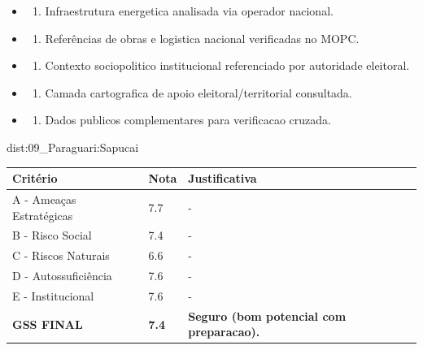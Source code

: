 {\begin{itemize}
\item
  \begin{enumerate}
  \def\labelenumi{\arabic{enumi})}
  \setcounter{enumi}{7}
  \tightlist
  \item
    Infraestrutura energetica analisada via operador nacional.
  \end{enumerate}
\item
  \begin{enumerate}
  \def\labelenumi{\arabic{enumi})}
  \setcounter{enumi}{8}
  \tightlist
  \item
    Referências de obras e logistica nacional verificadas no MOPC.
  \end{enumerate}
\item
  \begin{enumerate}
  \def\labelenumi{\arabic{enumi})}
  \setcounter{enumi}{9}
  \tightlist
  \item
    Contexto sociopolitico institucional referenciado por autoridade
    eleitoral.
  \end{enumerate}
\item
  \begin{enumerate}
  \def\labelenumi{\arabic{enumi})}
  \setcounter{enumi}{10}
  \tightlist
  \item
    Camada cartografica de apoio eleitoral/\allowbreak territorial consultada.
  \end{enumerate}
\item
  \begin{enumerate}
  \def\labelenumi{\arabic{enumi})}
  \setcounter{enumi}{11}
  \tightlist
  \item
    Dados publicos complementares para verificacao cruzada.
  \end{enumerate}
\end{itemize}}{dist:09_Paraguari:Sapucai}
\begin{table}[ht!]
\small \begin{tabular}{p{3.0cm}p{0.8cm}p{6.0cm}} \toprule
\textbf{Critério} & \textbf{Nota} & \textbf{Justificativa} \\ \midrule
A - Ameaças Estratégicas & 7.7 & - \\
B - Risco Social & 7.4 & - \\
C - Riscos Naturais & 6.6 & - \\
D - Autossuficiência & 7.6 & - \\
E - Institucional & 7.6 & - \\
\midrule \textbf{GSS FINAL} & \textbf{7.4} & \textbf{Seguro (bom potencial com preparacao).} \\ \bottomrule \end{tabular}
\end{table}
